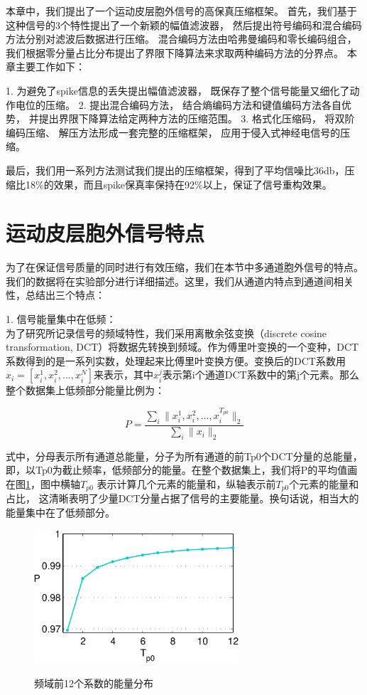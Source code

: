 本章中，我们提出了一个运动皮层胞外信号的高保真压缩框架。 首先，我们基于这种信号的3个特性提出了一个新颖的幅值滤波器，
然后提出符号编码和混合编码方法分别对滤波后数据进行压缩。 混合编码方法由哈弗曼编码和零长编码组合， 我们根据零分量占比分布提出了界限下降算法来求取两种编码方法的分界点。 
本章主要工作如下：

1. 为避免了spike信息的丢失提出幅值滤波器， 既保存了整个信号能量又细化了动作电位的压缩。
2. 提出混合编码方法， 结合熵编码方法和键值编码方法各自优势， 并提出界限下降算法给定两种方法的压缩范围。
3. 格式化压缩码， 将双阶编码压缩、 解压方法形成一套完整的压缩框架， 应用于侵入式神经电信号的压缩。



最后，我们用一系列方法测试我们提出的压缩框架，得到了平均信噪比36db，压缩比18\%的效果，而且spike保真率保持在92\%以上，保证了信号重构效果。





\section{运动皮层胞外信号特点}\label{sec:characteristic}


为了在保证信号质量的同时进行有效压缩，我们在本节中多通道胞外信号的特点。我们的数据将在实验部分进行详细描述。这里，我们从通道内特点到通道间相关性，总结出三个特点：

1. 信号能量集中在低频：\\
为了研究所记录信号的频域特性，我们采用离散余弦变换（discrete cosine transformation, DCT）将数据先转换到频域。作为傅里叶变换的一个变种，DCT系数得到的是一系列实数，处理起来比傅里叶变换方便。变换后的DCT系数用${x_i} = [x_i^{1},x_i^{2},...,x_i^{N}]$来表示，其中$x_i^j$表示第i个通道DCT系数中的第j个元素。那么整个数据集上低频部分能量比例为：

\begin{equation}\label{Eq:power Definition}
  P = \frac{\sum_i \|x_i^{1},x_i^{2},...,x_i^{T_{p0}}\|_2}{\sum_i \|x_i\|_2}
\end{equation}
 
式中，分母表示所有通道总能量，分子为所有通道的前Tp0个DCT分量的总能量，即，以Tp0为截止频率，低频部分的能量。在整个数据集上，我们将P的平均值画在图\ref{Fig:Characteristic1}，图中横轴$T_{p0}$ 表示计算几个元素的能量和，纵轴表示前$T_{p0}$个元素的能量和占比， 这清晰表明了少量DCT分量占据了信号的主要能量。换句话说，相当大的能量集中在了低频部分。

\begin{figure}
  \centering
  \includegraphics[width=3in]{Pictures/Compression/f1-crop.pdf}\\
  \caption{频域前12个系数的能量分布}\label{Fig:Characteristic1}
\end{figure}



